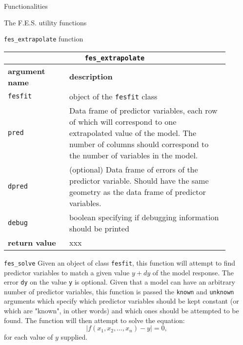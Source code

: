 \documentclass[10pt,a5paper]{article}
\begin{document}
\begin{section}{Functionalities}
\begin{subsection}{The F.E.S. utility functions}
\begin{subsubsection}{ {\tt fes\_extrapolate} function }
{ \centering
\begin{tabular}{|p{0.25\linewidth}|p{0.65\linewidth}|}
\hline
\multicolumn{2}{|c|}{ {\tt fes\_extrapolate} } \\
\hline \hline \textbf{argument name} & \textbf{description} \\
\hline {\tt fesfit} & object of the {\tt fesfit} class \\ 
{\tt pred} & Data frame of predictor variables, each row of which will
correspond to one extrapolated value of the model. The number of columns should
correspond to the number of variables in the model. \\ 
{\tt dpred} & (optional) Data frame of errors of the predictor variable. Should
have the same geometry as the data frame of predictor variables. \\ 
{\tt debug} & boolean specifying if debugging information should be printed \\
\hline \hline
\textbf{return value} & xxx \\
\hline
\end{tabular}
}

\end{subsubsection}

\begin{subsubsection}{ {\tt fes\_solve} }
Given an object of class {\tt fesfit}, this function will attempt to find predictor variables to match a given value $y+dy$ of the model response.
The error {\tt dy} on the value {\tt y} is optional.
Given that a model can have an arbitrary number of predictor variables, this function is passed the {\tt known} and {\tt unknown} arguments which specify which predictor variables should be kept constant (or which are "known", in other words) and which ones should be attempted to be found. The function will then attempt to solve the equation:
\begin{equation}
	| f(x_1, x_2, \ldots , x_n) - y | = 0,
\end{equation}
for each value of $y$ supplied.


\end{subsubsection}
\end{subsection}
\end{section}
\end{document}
